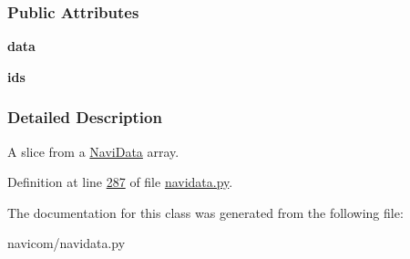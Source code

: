 \subsubsection*{Public Attributes}
\begin{DoxyCompactItemize}
\item 
\hypertarget{classnavicom_1_1navidata_1_1NaviSlice_a21ac86b9fbcb4ffc952782983690af5f}{
{\bfseries data}}
\label{classnavicom_1_1navidata_1_1NaviSlice_a21ac86b9fbcb4ffc952782983690af5f}

\item 
\hypertarget{classnavicom_1_1navidata_1_1NaviSlice_abc8769a0168ce54ee35624363deb0bcd}{
{\bfseries ids}}
\label{classnavicom_1_1navidata_1_1NaviSlice_abc8769a0168ce54ee35624363deb0bcd}

\end{DoxyCompactItemize}


\subsubsection{Detailed Description}
A slice from a \hyperlink{classnavicom_1_1navidata_1_1NaviData}{NaviData} array. 

Definition at line \hyperlink{navidata_8py_source_l00287}{287} of file \hyperlink{navidata_8py_source}{navidata.py}.



The documentation for this class was generated from the following file:\begin{DoxyCompactItemize}
\item 
navicom/navidata.py\end{DoxyCompactItemize}
